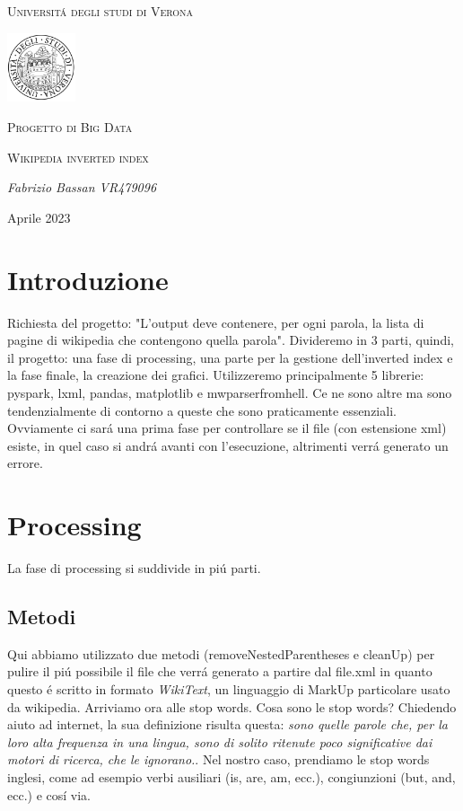 \documentclass[12pt,a4paper]{article}
\begin{document}
    \begin{titlepage}
    	\centering
        {\textsc{Universitá degli studi di Verona} \par}
        \par\vspace{1cm}
    	\includegraphics[width=0.15\textwidth]{logoUni.png}
        \par
    	\vspace{1cm}
    	{\Large \textsc{Progetto di Big Data}\par}
    	\vspace{1cm}
        {\Large \textsc{Wikipedia inverted index}\par}
    	\vspace{5cm}
    	{\Large\itshape Fabrizio Bassan VR479096\par}
    	\vfill
    	{\large Aprile 2023 \par}
    \end{titlepage}
    
    \tableofcontents
    \newpage
    \section{Introduzione}
    Richiesta del progetto: "L’output deve contenere, per ogni parola, la lista di pagine di wikipedia che contengono quella parola".
    Divideremo in 3 parti, quindi, il progetto: una fase di processing, una parte per la gestione dell'inverted index e la fase finale, la creazione dei grafici.
    Utilizzeremo principalmente 5 librerie: pyspark, lxml, pandas, matplotlib e mwparserfromhell.
    Ce ne sono altre ma sono tendenzialmente di contorno a queste che sono praticamente essenziali.
    \newline
    Ovviamente ci sará una prima fase per controllare se il file (con estensione xml) esiste, in quel caso si andrá avanti con l'esecuzione, altrimenti verrá generato un errore.
    \section{Processing}
    La fase di processing si suddivide in piú parti.
    \subsection{Metodi}
    Qui abbiamo utilizzato due metodi (removeNestedParentheses e cleanUp) per pulire il piú possibile il file che verrá generato a partire dal file.xml in quanto questo é scritto in formato \textit{WikiText}, un linguaggio di MarkUp particolare usato da wikipedia. Arriviamo ora alle stop words. Cosa sono le stop words? Chiedendo aiuto ad internet, la sua definizione risulta questa: \textit{sono quelle parole che, per la loro alta frequenza in una lingua, sono di solito ritenute poco significative dai motori di ricerca, che le ignorano.}. Nel nostro caso, prendiamo le stop words inglesi, come ad esempio verbi ausiliari (is, are, am, ecc.), congiunzioni (but, and, ecc.) e cosí via.
\end{document}
